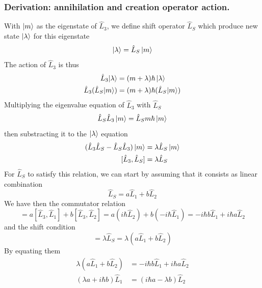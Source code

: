 \documentclass[../../../main.tex]{subfiles}
\begin{document}
\subsubsection{Derivation: annihilation and creation operator action.}
With $\ket{m}$ as the eigenstate of $\hat{L}_3$, we define shift operator $\hat{L}_S$ which produce new state $\ket{\lambda}$ for this eigenstate
\begin{equation*}
    \ket{\lambda}=\hat{L}_S \ket{m}
\end{equation*}
The action of $\hat{L}_3$ is thus
\begin{align*}
    \hat{L}_3 |\lambda\rangle       & =  (m+\lambda) \hbar \ket{\lambda}           \\
    \hat{L}_3 (\hat{L}_S |m\rangle) & =  (m + \lambda) \hbar (\hat{L}_S |m\rangle)
\end{align*}
Multiplying the eigenvalue equation of $\hat{L}_3$ with $\hat{L}_S$
\begin{equation*}
    \hat{L}_S\hat{L}_3 \ket{m}=\hat{L}_Sm \hbar \ket{m}
\end{equation*}
then substracting it to the $\ket{\lambda}$ equation
\begin{align*}
    (\hat{L}_3\hat{L}_S - \hat{L}_S\hat{L}_3) \ket{m} & = \lambda \hat{L}_S \ket{m} \\
    [\hat{L}_3,\hat{L}_S]                             & = \lambda \hat{L}_S
\end{align*}
For $\hat{L}_S$ to satisfy this relation, we can start by assuming that it consists as linear combination
\begin{equation*}
    \hat{L}_S = a\hat{L}_1 + b\hat{L}_2
\end{equation*}
We have then the commutator relation
\begin{equation*}
    [\hat{L}_3, \hat{L}_S] = a[\hat{L}_3, \hat{L}_1] + b[\hat{L}_3, \hat{L}_2] = a(i\hbar \hat{L}_2) + b(-i\hbar \hat{L}_1) = -i\hbar b \hat{L}_1 + i\hbar a \hat{L}_2
\end{equation*}
and the shift condition
\begin{equation*}
    [\hat{L}_3, \hat{L}_S] = \lambda \hat{L}_S = \lambda (a \hat{L}_1 + b \hat{L}_2)
\end{equation*}
By equating them
\begin{align*}
    \lambda (a \hat{L}_1 + b \hat{L}_2) & =  -i\hbar b \hat{L}_1 + i\hbar a \hat{L}_2 \\
    (\lambda a + i \hbar b)\hat{L}_1    & =  (i \hbar a - \lambda b )\hat{L}_2
\end{align*}
\end{document}

